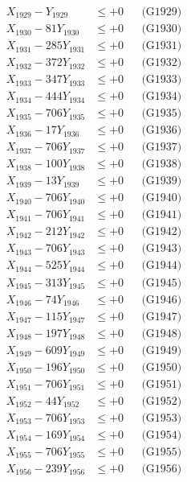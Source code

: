 \documentclass[a4paper,10pt]{article}
\begin{document}
{\begin{align}
X_{1929} - Y_{1929} &\leq +0 && \text{(G1929)} \\
X_{1930} - 81Y_{1930} &\leq +0 && \text{(G1930)} \\
\allowbreak
X_{1931} - 285Y_{1931} &\leq +0 && \text{(G1931)} \\
X_{1932} - 372Y_{1932} &\leq +0 && \text{(G1932)} \\
X_{1933} - 347Y_{1933} &\leq +0 && \text{(G1933)} \\
X_{1934} - 444Y_{1934} &\leq +0 && \text{(G1934)} \\
X_{1935} - 706Y_{1935} &\leq +0 && \text{(G1935)} \\
X_{1936} - 17Y_{1936} &\leq +0 && \text{(G1936)} \\
X_{1937} - 706Y_{1937} &\leq +0 && \text{(G1937)} \\
X_{1938} - 100Y_{1938} &\leq +0 && \text{(G1938)} \\
X_{1939} - 13Y_{1939} &\leq +0 && \text{(G1939)} \\
X_{1940} - 706Y_{1940} &\leq +0 && \text{(G1940)} \\
\allowbreak
X_{1941} - 706Y_{1941} &\leq +0 && \text{(G1941)} \\
X_{1942} - 212Y_{1942} &\leq +0 && \text{(G1942)} \\
X_{1943} - 706Y_{1943} &\leq +0 && \text{(G1943)} \\
X_{1944} - 525Y_{1944} &\leq +0 && \text{(G1944)} \\
X_{1945} - 313Y_{1945} &\leq +0 && \text{(G1945)} \\
X_{1946} - 74Y_{1946} &\leq +0 && \text{(G1946)} \\
X_{1947} - 115Y_{1947} &\leq +0 && \text{(G1947)} \\
X_{1948} - 197Y_{1948} &\leq +0 && \text{(G1948)} \\
X_{1949} - 609Y_{1949} &\leq +0 && \text{(G1949)} \\
X_{1950} - 196Y_{1950} &\leq +0 && \text{(G1950)} \\
\allowbreak
X_{1951} - 706Y_{1951} &\leq +0 && \text{(G1951)} \\
X_{1952} - 44Y_{1952} &\leq +0 && \text{(G1952)} \\
X_{1953} - 706Y_{1953} &\leq +0 && \text{(G1953)} \\
X_{1954} - 169Y_{1954} &\leq +0 && \text{(G1954)} \\
X_{1955} - 706Y_{1955} &\leq +0 && \text{(G1955)} \\
X_{1956} - 239Y_{1956} &\leq +0 && \text{(G1956)} \\

\end{align}}
\end{document}
